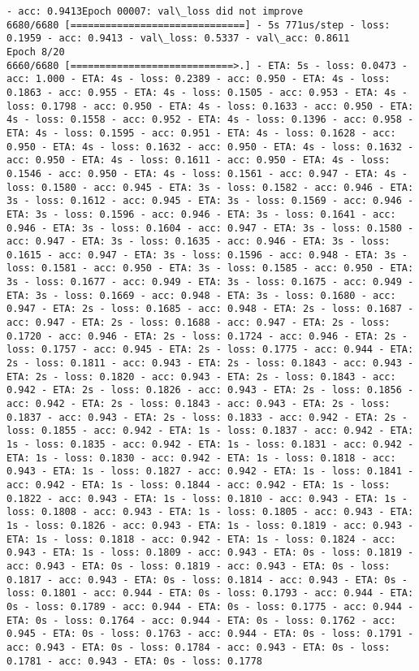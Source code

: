 \documentclass[11pt]{article}
\begin{document}
\begin{Verbatim}[commandchars=\\\{\}]
- acc: 0.9413Epoch 00007: val\_loss did not improve
6680/6680 [==============================] - 5s 771us/step - loss: 0.1959 - acc: 0.9413 - val\_loss: 0.5337 - val\_acc: 0.8611
Epoch 8/20
6660/6680 [============================>.] - ETA: 5s - loss: 0.0473 - acc: 1.000 - ETA: 4s - loss: 0.2389 - acc: 0.950 - ETA: 4s - loss: 0.1863 - acc: 0.955 - ETA: 4s - loss: 0.1505 - acc: 0.953 - ETA: 4s - loss: 0.1798 - acc: 0.950 - ETA: 4s - loss: 0.1633 - acc: 0.950 - ETA: 4s - loss: 0.1558 - acc: 0.952 - ETA: 4s - loss: 0.1396 - acc: 0.958 - ETA: 4s - loss: 0.1595 - acc: 0.951 - ETA: 4s - loss: 0.1628 - acc: 0.950 - ETA: 4s - loss: 0.1632 - acc: 0.950 - ETA: 4s - loss: 0.1632 - acc: 0.950 - ETA: 4s - loss: 0.1611 - acc: 0.950 - ETA: 4s - loss: 0.1546 - acc: 0.950 - ETA: 4s - loss: 0.1561 - acc: 0.947 - ETA: 4s - loss: 0.1580 - acc: 0.945 - ETA: 3s - loss: 0.1582 - acc: 0.946 - ETA: 3s - loss: 0.1612 - acc: 0.945 - ETA: 3s - loss: 0.1569 - acc: 0.946 - ETA: 3s - loss: 0.1596 - acc: 0.946 - ETA: 3s - loss: 0.1641 - acc: 0.946 - ETA: 3s - loss: 0.1604 - acc: 0.947 - ETA: 3s - loss: 0.1580 - acc: 0.947 - ETA: 3s - loss: 0.1635 - acc: 0.946 - ETA: 3s - loss: 0.1615 - acc: 0.947 - ETA: 3s - loss: 0.1596 - acc: 0.948 - ETA: 3s - loss: 0.1581 - acc: 0.950 - ETA: 3s - loss: 0.1585 - acc: 0.950 - ETA: 3s - loss: 0.1677 - acc: 0.949 - ETA: 3s - loss: 0.1675 - acc: 0.949 - ETA: 3s - loss: 0.1669 - acc: 0.948 - ETA: 3s - loss: 0.1680 - acc: 0.947 - ETA: 2s - loss: 0.1685 - acc: 0.948 - ETA: 2s - loss: 0.1687 - acc: 0.947 - ETA: 2s - loss: 0.1688 - acc: 0.947 - ETA: 2s - loss: 0.1720 - acc: 0.946 - ETA: 2s - loss: 0.1724 - acc: 0.946 - ETA: 2s - loss: 0.1757 - acc: 0.945 - ETA: 2s - loss: 0.1775 - acc: 0.944 - ETA: 2s - loss: 0.1811 - acc: 0.943 - ETA: 2s - loss: 0.1843 - acc: 0.943 - ETA: 2s - loss: 0.1820 - acc: 0.943 - ETA: 2s - loss: 0.1843 - acc: 0.942 - ETA: 2s - loss: 0.1826 - acc: 0.943 - ETA: 2s - loss: 0.1856 - acc: 0.942 - ETA: 2s - loss: 0.1843 - acc: 0.943 - ETA: 2s - loss: 0.1837 - acc: 0.943 - ETA: 2s - loss: 0.1833 - acc: 0.942 - ETA: 2s - loss: 0.1855 - acc: 0.942 - ETA: 1s - loss: 0.1837 - acc: 0.942 - ETA: 1s - loss: 0.1835 - acc: 0.942 - ETA: 1s - loss: 0.1831 - acc: 0.942 - ETA: 1s - loss: 0.1830 - acc: 0.942 - ETA: 1s - loss: 0.1818 - acc: 0.943 - ETA: 1s - loss: 0.1827 - acc: 0.942 - ETA: 1s - loss: 0.1841 - acc: 0.942 - ETA: 1s - loss: 0.1844 - acc: 0.942 - ETA: 1s - loss: 0.1822 - acc: 0.943 - ETA: 1s - loss: 0.1810 - acc: 0.943 - ETA: 1s - loss: 0.1808 - acc: 0.943 - ETA: 1s - loss: 0.1805 - acc: 0.943 - ETA: 1s - loss: 0.1826 - acc: 0.943 - ETA: 1s - loss: 0.1819 - acc: 0.943 - ETA: 1s - loss: 0.1818 - acc: 0.942 - ETA: 1s - loss: 0.1824 - acc: 0.943 - ETA: 1s - loss: 0.1809 - acc: 0.943 - ETA: 0s - loss: 0.1819 - acc: 0.943 - ETA: 0s - loss: 0.1819 - acc: 0.943 - ETA: 0s - loss: 0.1817 - acc: 0.943 - ETA: 0s - loss: 0.1814 - acc: 0.943 - ETA: 0s - loss: 0.1801 - acc: 0.944 - ETA: 0s - loss: 0.1793 - acc: 0.944 - ETA: 0s - loss: 0.1789 - acc: 0.944 - ETA: 0s - loss: 0.1775 - acc: 0.944 - ETA: 0s - loss: 0.1764 - acc: 0.944 - ETA: 0s - loss: 0.1762 - acc: 0.945 - ETA: 0s - loss: 0.1763 - acc: 0.944 - ETA: 0s - loss: 0.1791 - acc: 0.943 - ETA: 0s - loss: 0.1784 - acc: 0.943 - ETA: 0s - loss: 0.1781 - acc: 0.943 - ETA: 0s - loss: 0.1778 
\end{Verbatim}
\end{document}
